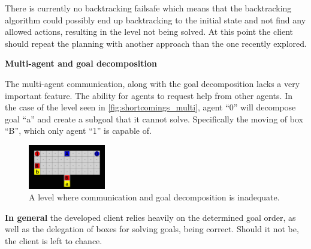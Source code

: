 \documentclass[Main]{subfiles}
\begin{document}
There is currently no backtracking failsafe which means that the backtracking algorithm could possibly end up backtracking to the initial state and not find any allowed actions, resulting in the level not being solved. 
At this point the client should repeat the planning with another approach than the one recently explored. 



\textbf{Multi-agent and goal decomposition}

The multi-agent communication, along with the goal decomposition lacks a very important feature. The ability for agents to request help from other agents. In the case of the level seen in \autoref{fig:shortcomings_multi}, agent ``0'' will decompose goal ``a'' and create a subgoal that it cannot solve. Specifically the moving of box ``B'', which only agent ``1'' is capable of. 
\begin{figure}[h!]
    \centering
    \includegraphics[width=0.3\textwidth]{shortcomings_multi.png}
    \caption{A level where communication and goal decomposition is inadequate.}
    \label{fig:shortcomings_multi}
\end{figure}


\textbf{In general} the developed client relies heavily on the determined goal order, as well as the delegation of boxes for solving goals, being correct. Should it not be, the client is left to chance. 
\end{document}
